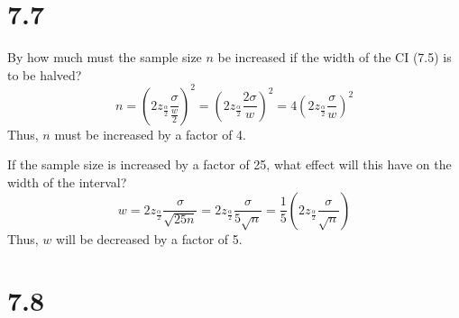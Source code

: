 \documentclass[letterpaper,12pt,fleqn]{article}
\renewcommand{\a}{\alpha}
\renewcommand{\o}{\sigma}
\newcommand{\zadt}{z_{\frac{\a}{2}}}
\begin{document}
\section*{7.7}

By how much must the sample size \(n\) be increased if the width of the CI (7.5) is to be halved?
\[n=\left(2\zadt\frac{\o}{\frac{w}{2}}\right)^2=\left(2\zadt\frac{2\o}{w}\right)^2=4\left(2\zadt\frac{\o}{w}\right)^2\]
Thus, \(n\) must be increased by a factor of 4.

If the sample size is increased by a factor of 25, what effect will this have on the width of the interval?
\[w=2\zadt\frac{\o}{\sqrt{25n}}=2\zadt\frac{\o}{5\sqrt{n}}=\frac{1}{5}\left(2\zadt\frac{\o}{\sqrt{n}}\right)\]
Thus, \(w\) will be decreased by a factor of 5.

\section*{7.8}
\end{document}
